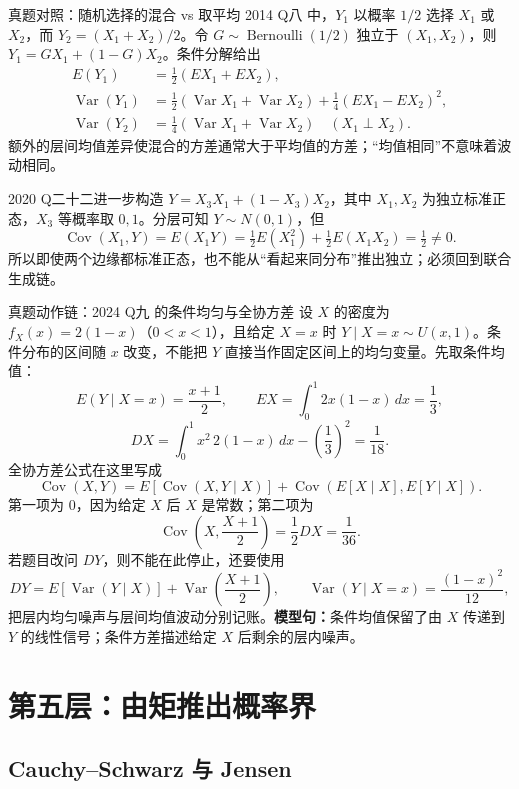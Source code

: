 \documentclass[11pt,a4paper]{ctexart}
\newcommand{\kw}[1]{\textbf{\color{deep}#1}}
\begin{document}
\begin{examplebox}{真题对照：随机选择的混合 vs 取平均}
2014 Q八 中，$Y_1$ 以概率 $1/2$ 选择 $X_1$ 或 $X_2$，而 $Y_2=(X_1+X_2)/2$。令 $G\sim\operatorname{Bernoulli}(1/2)$ 独立于 $(X_1,X_2)$，则 $Y_1=GX_1+(1-G)X_2$。条件分解给出
\[
\begin{aligned}
E(Y_1)&=\tfrac12(E X_1+E X_2),\\
\operatorname{Var}(Y_1)&=\tfrac12(\operatorname{Var}X_1+\operatorname{Var}X_2)
 +\tfrac14(E X_1-E X_2)^2,\\
\operatorname{Var}(Y_2)&=\tfrac14(\operatorname{Var}X_1+\operatorname{Var}X_2)
\quad(X_1\perp X_2).
\end{aligned}
\]
额外的层间均值差异使混合的方差通常大于平均值的方差；“均值相同”不意味着波动相同。

2020 Q二十二进一步构造 $Y=X_3X_1+(1-X_3)X_2$，其中 $X_1,X_2$ 为独立标准正态，$X_3$ 等概率取 $0,1$。分层可知 $Y\sim N(0,1)$，但
\[
\operatorname{Cov}(X_1,Y)=E(X_1Y)=\tfrac12E(X_1^2)+\tfrac12E(X_1X_2)=\tfrac12\ne0.
\]
所以即使两个边缘都标准正态，也不能从“看起来同分布”推出独立；必须回到联合生成链。
\end{examplebox}

\begin{examplebox}{真题动作链：2024 Q九 的条件均匀与全协方差}
设 $X$ 的密度为 $f_X(x)=2(1-x)$（$0<x<1$），且给定 $X=x$ 时
$Y\mid X=x\sim U(x,1)$。条件分布的区间随 $x$ 改变，不能把 $Y$
直接当作固定区间上的均匀变量。先取条件均值：
\[
E(Y\mid X=x)=\frac{x+1}{2},\qquad EX=\int_0^1 2x(1-x)\,dx=\frac13,
\]
\[
DX=\int_0^1x^2\,2(1-x)\,dx-\left(\frac13\right)^2=\frac1{18}.
\]
全协方差公式在这里写成
\[
\operatorname{Cov}(X,Y)
=E[\operatorname{Cov}(X,Y\mid X)]
 +\operatorname{Cov}(E[X\mid X],E[Y\mid X]).
\]
第一项为 $0$，因为给定 $X$ 后 $X$ 是常数；第二项为
\[
\operatorname{Cov}\left(X,\frac{X+1}{2}\right)=\frac12DX=\frac1{36}.
\]
若题目改问 $DY$，则不能在此停止，还要使用
\[
DY=E[\operatorname{Var}(Y\mid X)]+\operatorname{Var}\left(\frac{X+1}{2}\right),
\qquad \operatorname{Var}(Y\mid X=x)=\frac{(1-x)^2}{12},
\]
把层内均匀噪声与层间均值波动分别记账。\kw{模型句：}条件均值保留了由 $X$ 传递到 $Y$ 的线性信号；条件方差描述给定 $X$ 后剩余的层内噪声。
\end{examplebox}

\section{第五层：由矩推出概率界}

\subsection{Cauchy--Schwarz 与 Jensen}
\end{document}
